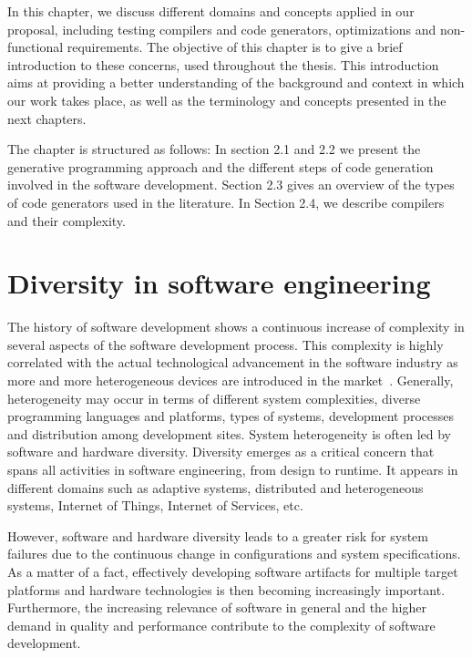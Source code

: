  
In this chapter, we discuss different domains and concepts applied in our proposal, including testing compilers and code generators, optimizations and non-functional requirements.
The objective of this chapter is to give a brief introduction to these concerns, used throughout the thesis. This introduction aims at providing a better understanding of the background and context in which our work takes place, as well as the terminology and concepts presented in the next chapters.

The chapter is structured as follows: In section 2.1 and 2.2 we present the generative programming approach and the different steps of code generation involved in the software development. Section 2.3 gives an overview of the types of code generators used in the literature. In Section 2.4, we describe compilers and their complexity.


\section{Diversity in software engineering}
The history of software development shows a continuous increase of complexity in several aspects of the software development process. This complexity is highly correlated with the actual technological advancement in the software industry as more and more heterogeneous devices are introduced in the market~\cite{betz2011improving}. 
Generally, heterogeneity may occur in terms of different system complexities, diverse programming languages and platforms, types of systems, development processes and distribution among development sites\cite{ghazi2015heterogeneous}.
System heterogeneity is often led by software and hardware diversity.
Diversity emerges as a critical concern that spans all activities in software engineering, from design to runtime\cite{acher2014software}. It appears in different domains such as adaptive systems, distributed and heterogeneous systems, Internet of Things, Internet of Services, etc.

However, software and hardware diversity leads to a greater risk for system failures due to the continuous change in configurations and system specifications.
As a matter of a fact, effectively developing software artifacts for multiple target platforms and hardware technologies is then becoming increasingly important.
Furthermore, the increasing relevance of software in general and the higher demand in quality and performance contribute to the complexity of software development.

